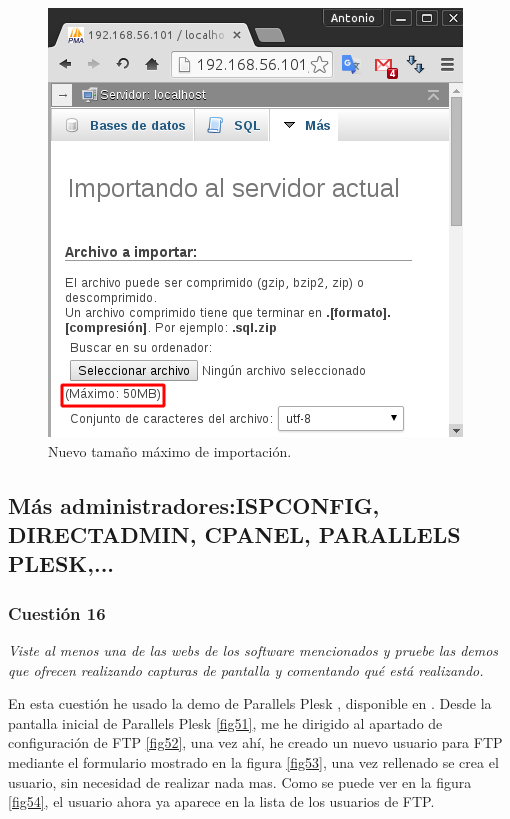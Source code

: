 \begin{figure}[H]
    \begin{center}
        \includegraphics[scale=0.5]{imagenes/img38}
        \caption{Nuevo tamaño máximo de importación.}
        \label{fig35}
    \end{center}
\end{figure}

\subsection{Más administradores:ISPCONFIG, DIRECTADMIN, CPANEL, PARALLELS PLESK,... }
\subsubsection{Cuestión 16}
\textit{Viste al menos una de las webs de los software mencionados y pruebe las demos que ofrecen realizando capturas de pantalla y comentando qué está realizando.}
\newline

En esta cuestión he usado la demo de Parallels Plesk , disponible en \cite{pp}. Desde la pantalla inicial de Parallels Plesk \ref{fig51}, me he dirigido al apartado de configuración de FTP \ref{fig52}, una vez ahí, he creado un nuevo usuario para FTP mediante el formulario mostrado en la figura \ref{fig53}, una vez rellenado se crea el usuario, sin necesidad de realizar nada mas. Como se puede ver en la figura \ref{fig54}, el usuario ahora ya aparece en la lista de los usuarios de FTP.

